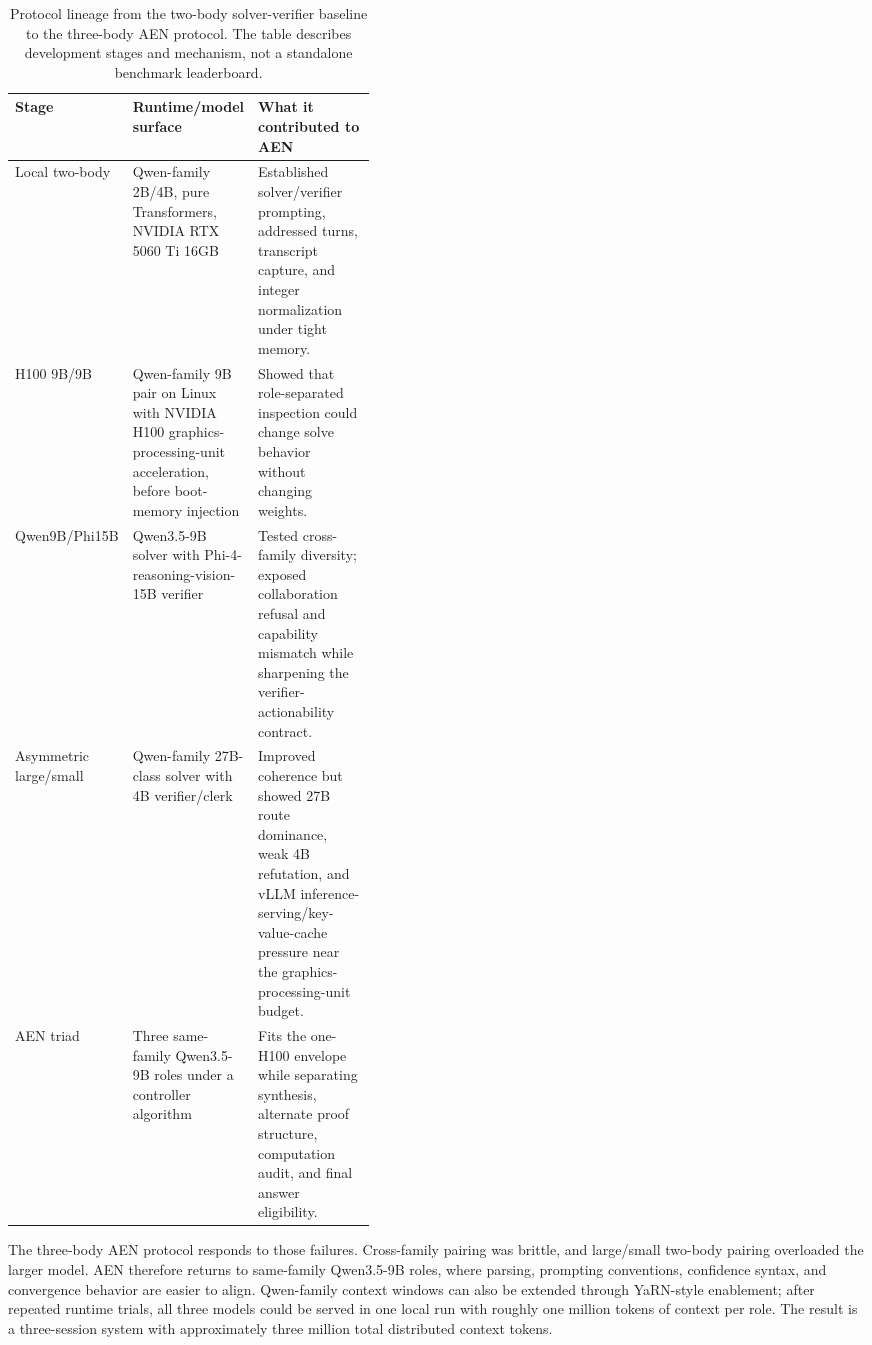 \documentclass[11pt]{article}
\begin{document}
\begin{table}[!htbp]
\centering
\scriptsize
\begin{tabularx}{\linewidth}{p{0.18\linewidth}p{0.24\linewidth}X}
\toprule
Stage & Runtime/model surface & What it contributed to AEN \\
\midrule
Local two-body & Qwen-family 2B/4B, pure Transformers, NVIDIA RTX 5060 Ti 16GB & Established solver/verifier prompting, addressed turns, transcript capture, and integer normalization under tight memory. \\
H100 9B/9B & Qwen-family 9B pair on Linux with NVIDIA H100 graphics-processing-unit acceleration, before boot-memory injection & Showed that role-separated inspection could change solve behavior without changing weights. \\
Qwen9B/Phi15B & Qwen3.5-9B solver with Phi-4-reasoning-vision-15B verifier & Tested cross-family diversity; exposed collaboration refusal and capability mismatch while sharpening the verifier-actionability contract. \\
Asymmetric large/small & Qwen-family 27B-class solver with 4B verifier/clerk & Improved coherence but showed 27B route dominance, weak 4B refutation, and vLLM inference-serving/key-value-cache pressure near the graphics-processing-unit budget. \\
AEN triad & Three same-family Qwen3.5-9B roles under a controller algorithm & Fits the one-H100 envelope while separating synthesis, alternate proof structure, computation audit, and final answer eligibility. \\
\bottomrule
\end{tabularx}
\caption{Protocol lineage from the two-body solver-verifier baseline to the three-body AEN protocol. The table describes development stages and mechanism, not a standalone benchmark leaderboard.}
\label{tab:two-body-lineage}
\end{table}

The three-body AEN protocol responds to those failures. Cross-family pairing was brittle, and large/small two-body pairing overloaded the larger model. AEN therefore returns to same-family Qwen3.5-9B roles, where parsing, prompting conventions, confidence syntax, and convergence behavior are easier to align. Qwen-family context windows can also be extended through YaRN-style enablement; after repeated runtime trials, all three models could be served in one local run with roughly one million tokens of context per role. The result is a three-session system with approximately three million total distributed context tokens.
\end{document}
